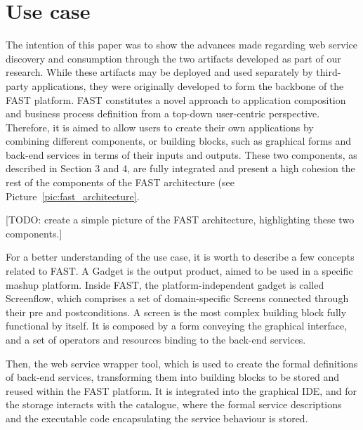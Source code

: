 
\section{Use case}
\label{sec:use_case}

The intention of this paper was to show the advances made regarding web service discovery and consumption through the two artifacts developed as part of our research. While these artifacts may be deployed and used separately by third-party applications, they were originally developed to form the backbone of the FAST platform. FAST constitutes a novel approach to application composition and business process definition from a top-down user-centric perspective. Therefore, it is aimed to allow users to create their own applications by combining different components, or building blocks, such as graphical forms and back-end services in terms of their inputs and outputs. These two components, as described in Section 3 and 4, are fully integrated and present a high cohesion the rest of the components of the FAST architecture (see Picture~\ref{pic:fast_architecture}. 

[TODO: create a simple picture of the FAST architecture, highlighting these two components.]

For a better understanding of the use case, it is worth to describe a few concepts related to FAST. A Gadget is the output product, aimed to be used in a specific mashup platform. Inside FAST, the platform-independent gadget is called Screenflow, which comprises a set of domain-specific Screens connected through their pre and postconditions. A screen is the most complex building block fully functional by itself. It is composed by a form conveying the graphical interface, and a set of operators and resources binding to the back-end services.

Then, the web service wrapper tool, which is used to create the formal definitions of back-end services, transforming them into building blocks to be stored and reused within the FAST platform. It is integrated into the graphical IDE, and for the storage interacts with the catalogue, where the formal service descriptions and the executable code encapsulating the service behaviour is stored.

